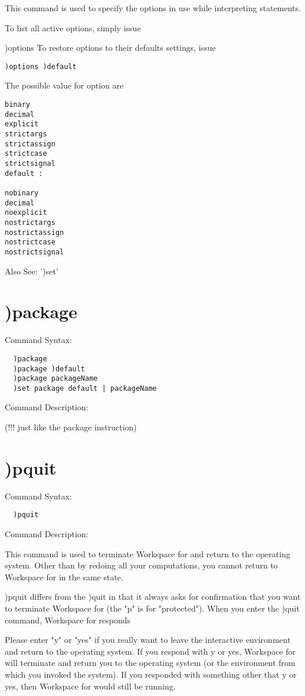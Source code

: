 This command is used to specify the options in use while interpreting statements.

To list all active options, simply issue

)options
To restore options to their defaults settings, issue
\begin{verbatim}
)options )default
\end{verbatim}
The possible value for option are
\begin{verbatim}
binary
decimal
explicit
strictargs
strictassign
strictcase
strictsignal
default :

nobinary
decimal
noexplicit
nostrictargs
nostrictassign
nostrictcase
nostrictsignal
\end{verbatim}
Also See: ')set'

\section{)package}

Command Syntax:
\begin{verbatim}
  )package
  )package )default
  )package packageName
  )set package default | packageName
\end{verbatim}
Command Description:

(!!! just like the package instruction)

\section{)pquit}

Command Syntax:
\begin{verbatim}
  )pquit
\end{verbatim}
Command Description:

This command is used to terminate Workspace for \nr{} and return to the operating system. Other than by redoing all your computations, you cannot return to Workspace for \nr{} in the same state.

)pquit differs from the )quit in that it always asks for confirmation that you want to terminate Workspace for \nr{} (the "p" is for "protected"). When you enter the )quit command, Workspace for \nr{} responds

  Please enter "y" or "yes" if you really want to leave the interactive
  environment and return to the operating system.
If you respond with y or yes, Workspace for \nr{} will terminate and return you to the operating system (or the environment from which you invoked the system). If you responded with something other that y or yes, then Workspace for \nr{} would still be running.

